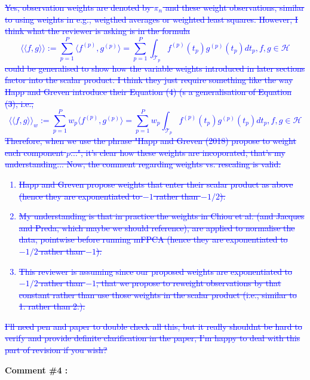 \documentclass[11pt]{article}
\begin{document}
\textcolor{blue}{
\sout{Yes, observation weights are denoted by $\pi_n$ and these weight observations, similar to using weights in e.g., weigthed averages or weighted least squares. However, I think what the reviewer is asking is in the formula}
$$\langle\langle f,g \rangle\rangle := \sum_{p=1}^P \langle f^{(p)},g^{(p)}\rangle = \sum_{p=1}^P \int_{\mathcal{T}_p}  f^{(p)}(t_p)g^{(p)}(t_p)dt_p, f,g \in \mathcal{H}$$
\sout{could be generalised to show how the variable weights introduced in later sections factor into the scalar product. I think they just require something like the way Happ and Greven introduce their Equation (4) (s a generalisation of Equation (3), i.e.,}
$$\langle\langle f,g \rangle\rangle_w := \sum_{p=1}^P w_p \langle f^{(p)},g^{(p)}\rangle = \sum_{p=1}^P w_p \int_{\mathcal{T}_p}  f^{(p)}(t_p)g^{(p)}(t_p)dt_p, f,g \in \mathcal{H}$$
\sout{Therefore, when we use the phrase "Happ and Greven (2018) propose to weight each component $p$...", it's clear how these weights are incoporated, that’s my understanding... Now, the comment regarding weights vs. rescaling is valid:}
\begin{enumerate}
  \item \sout{Happ and Greven propose weights that enter their scalar product as above (hence they are exponentiated to $-1$ rather than $-1/2$).}
  \item \sout{My understanding is that in practice the weights in Chiou et al. (and Jacques and Preda, which maybe we should reference), are applied to normalise the data, pointwise before running mFPCA (hence they are exponentiated to $-1/2$ rather than $-1$).}
  \item \sout{This reviewer is assuming since our proposed weights are exponentiated to $-1/2$ rather than $-1$, that we propose to reweight observations by that constant rather than use those weights in the scalar product (i.e., similar to 1. rather than 2.).}
\end{enumerate}
\sout{I'll need pen and paper to double check all this, but it really shouldnt be hard to verify and provide definite clarification in the paper, I'm happy to deal with this part of revision if you wish?}}



\bigskip


\itshape


\textbf{Comment \#4 :}
\end{document}
